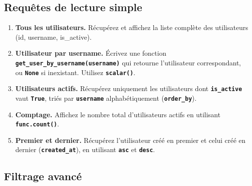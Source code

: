 \documentclass[12pt,a4paper]{article}
\newcommand{\kw}[1]{\texttt{\textbf{#1}}}
\begin{document}
\subsection{Requêtes de lecture simple}

\begin{mdframed}[style=exercice]
\begin{enumerate}[label=\textbf{Q\arabic*.}]
    \item \textbf{Tous les utilisateurs.} Récupérez et affichez la liste complète des utilisateurs (id, username, is\_active).

    \item \textbf{Utilisateur par username.} Écrivez une fonction \kw{get\_user\_by\_username(username)} qui retourne l'utilisateur correspondant, ou \kw{None} si inexistant. Utilisez \kw{scalar()}.

    \item \textbf{Utilisateurs actifs.} Récupérez uniquement les utilisateurs dont \kw{is\_active} vaut \kw{True}, triés par \kw{username} alphabétiquement (\kw{order\_by}).

    \item \textbf{Comptage.} Affichez le nombre total d'utilisateurs actifs en utilisant \kw{func.count()}.

    \item \textbf{Premier et dernier.} Récupérez l'utilisateur créé en premier et celui créé en dernier (\kw{created\_at}), en utilisant \kw{asc} et \kw{desc}.
\end{enumerate}
\end{mdframed}

\subsection{Filtrage avancé}
\end{document}
